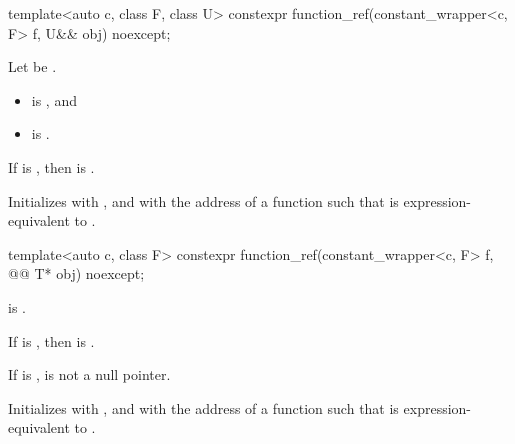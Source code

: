 %
\begin{itemdecl}
template<auto c, class F, class U>
  constexpr function_ref(constant_wrapper<c, F> f, U&& obj) noexcept;
\end{itemdecl}

\begin{itemdescr}
\pnum
Let  be .

\pnum
\constraints
\begin{itemize}
\item {} is , and
\item {} is .
\end{itemize}

\pnum
\mandates
If  is ,
then  is .

\pnum
\effects
Initializes
 with , and
 with the address of a function 
such that
is expression-equivalent to
.
\end{itemdescr}

%
\begin{itemdecl}
template<auto c, class F>
  constexpr function_ref(constant_wrapper<c, F> f, @\cv{}@ T* obj) noexcept;
\end{itemdecl}

\begin{itemdescr}
\pnum
\constraints
{} is .

\pnum
\mandates
If  is ,
then  is .

\pnum
\expects
If  is ,
 is not a null pointer.

\pnum
\effects
Initializes
 with , and
 with the address of a function 
such that
is expression-equivalent to
.
\end{itemdescr}

